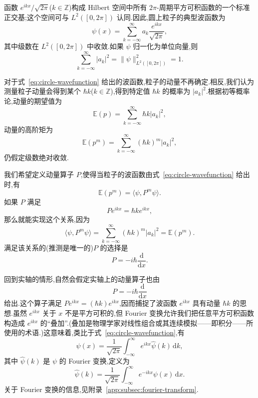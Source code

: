 函数 \(e^{ikx}/\sqrt{2\pi}\)(\(k\in\mathbb{Z}\))构成 Hilbert 空间中所有 \(2\pi\)-周期平方可积函数的一个标准正交基;这个空间可与 \(L^{2}([0,2\pi])\) 认同.因此,圆上粒子的典型波函数为
\begin{equation}
\psi(x)=\sum_{k=-\infty}^{\infty}a_{k}\frac{e^{ikx}}{\sqrt{2\pi}},
\label{eq:circle-wavefunction}
\end{equation}
其中级数在 \(L^{2}([0,2\pi])\) 中收敛.如果 \(\psi\) 归一化为单位向量,则
\begin{equation}
\sum_{k=-\infty}^{\infty}|a_{k}|^{2}
=\|\psi\|_{L^{2}([0,2\pi])}^{2}=1.
\label{eq:circle-normalization}
\end{equation}

对于式~\eqref{eq:circle-wavefunction} 给出的波函数,粒子的动量不再确定.相反,我们认为测量粒子动量会得到某个 \(\hbar k\)(\(k\in\mathbb{Z}\)),得到特定值 \(\hbar k\) 的概率为 \(|a_{k}|^{2}\).根据初等概率论,动量的期望值为
\begin{equation}
\mathbb{E}(p)=\sum_{k=-\infty}^{\infty}\hbar k|a_{k}|^{2},
\label{eq:momentum-expectation-circle}
\end{equation}
动量的高阶矩为
\begin{equation}
\mathbb{E}(p^{m})=\sum_{k=-\infty}^{\infty}(\hbar k)^{m}|a_{k}|^{2},
\label{eq:momentum-moment-circle}
\end{equation}
仍假定级数绝对收敛.

我们希望定义动量算子 \(P\),使得当粒子的波函数由式~\eqref{eq:circle-wavefunction} 给出时,有
\[
\mathbb{E}(p^{m})=\langle\psi,P^{m}\psi\rangle.
\]
如果 \(P\) 满足
\[
Pe^{ikx}=\hbar k e^{ikx},
\]
那么就能实现这个关系,因为
\[
\langle\psi,P^{m}\psi\rangle
=\sum_{k=-\infty}^{\infty}(\hbar k)^{m}|a_{k}|^{2}
=\mathbb{E}(p^{m}).
\]
满足该关系的(推测是唯一的)\(P\) 的选择是
\[
P=-i\hbar\frac{\mathrm{d}}{\mathrm{d}x}.
\]

回到实轴的情形,自然会假定实轴上的动量算子也由
\[
P=-i\hbar\frac{\mathrm{d}}{\mathrm{d}x}
\]
给出.这个算子满足 \(Pe^{ikx}=(\hbar k)e^{ikx}\),因而捕捉了波函数 \(e^{ikx}\) 具有动量 \(\hbar k\) 的思想.虽然 \(e^{ikx}\) 关于 \(x\) 不是平方可积的,但 Fourier 变换允许我们把任意平方可积函数构造成 \(e^{ikx}\) 的“叠加”.(叠加是物理学家对线性组合或其连续模拟——即积分——所使用的术语.)这意味着,类比于式~\eqref{eq:circle-wavefunction},有
\begin{equation}
\psi(x)=\frac{1}{\sqrt{2\pi}}\int_{-\infty}^{\infty}e^{ikx}\widehat{\psi}(k)\,\mathrm{d}k,
\label{eq:inverse-fourier-wavefunction}
\end{equation}
其中 \(\widehat{\psi}(k)\) 是 \(\psi\) 的 Fourier 变换,定义为
\begin{equation}
\widehat{\psi}(k)=\frac{1}{\sqrt{2\pi}}\int_{-\infty}^{\infty}e^{-ikx}\psi(x)\,\mathrm{d}x.
\label{eq:fourier-transform}
\end{equation}
关于 Fourier 变换的信息,见附录~\ref{app:subsec:fourier-transform}.

